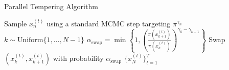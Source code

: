 \documentclass[aspectratio=169]{beamer}
\begin{document}
\begin{frame}{Parallel Tempering Algorithm}
\begin{algorithm}[H]
\caption{Parallel Tempering MCMC}
\begin{algorithmic}[1]
        \STATE Sample $x_n^{(t)}$ using a standard MCMC step targeting $\pi^{\gamma_n}$
    \ENDFOR
        \STATE $k \sim \text{Uniform}\{1, \ldots, N-1\}$
        \STATE $\alpha_{\text{swap}} = \min\left\{1, \left(\frac{\pi(x_{k+1}^{(t)})}{\pi(x_k^{(t)})}\right)^{\gamma_k - \gamma_{k+1}}\right\}$
        \STATE Swap $(x_k^{(t)}, x_{k+1}^{(t)})$ with probability $\alpha_{\text{swap}}$
    \ENDIF
\ENDFOR
\RETURN $\{x_N^{(t)}\}_{t=1}^T$

\end{algorithmic}
\end{algorithm}


\end{frame}
\end{document}
